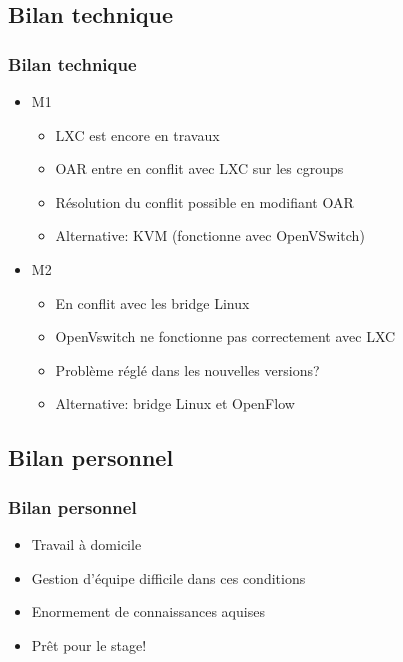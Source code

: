 \documentclass{beamer}
\begin{document}
	  \subsection{Bilan technique}
	    \begin{frame}
        \frametitle{Bilan technique}
		    \begin{itemize}
		      \item M1
		      \begin{itemize}
		        \item LXC est encore en travaux 
		        \item OAR entre en conflit avec LXC sur les cgroups
   		      \item Résolution du conflit possible en modifiant OAR
   		      \item Alternative: KVM (fonctionne avec OpenVSwitch) 
		      \end{itemize}
		      \item M2
		      \begin{itemize}
		        \item En conflit avec les bridge Linux
		        \item OpenVswitch ne fonctionne pas correctement avec LXC
		        \item Problème réglé dans les nouvelles versions?
		        \item Alternative: bridge Linux et OpenFlow
		      \end{itemize}
		    \end{itemize}
	    \end{frame}
	    
	  \subsection{Bilan personnel} 
	    \begin{frame}
        \frametitle{Bilan personnel}
		    \begin{itemize}
		      \item Travail à domicile
		      \item Gestion d'équipe difficile dans ces conditions
		      \item Enormement de connaissances aquises
		      \item Prêt pour le stage!
		    \end{itemize}
	    \end{frame}
		
\end{document}
